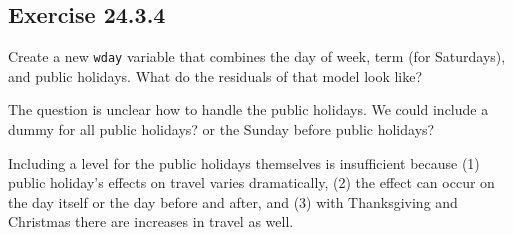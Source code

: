 \documentclass[]{book}
\newenvironment{Shaded}{\begin{snugshade}}{\end{snugshade}}
\newcommand{\CommentTok}[1]{\textcolor[rgb]{0.56,0.35,0.01}{\textit{#1}}}
\newcommand{\KeywordTok}[1]{\textcolor[rgb]{0.13,0.29,0.53}{\textbf{#1}}}
\newcommand{\NormalTok}[1]{#1}
\newcommand{\OperatorTok}[1]{\textcolor[rgb]{0.81,0.36,0.00}{\textbf{#1}}}
\newcommand{\StringTok}[1]{\textcolor[rgb]{0.31,0.60,0.02}{#1}}
\theoremstyle{plain}
\theoremstyle{remark}
\begin{document}
\begin{Shaded}
\end{Shaded}

\hypertarget{exercise-24.3.4}{%
\subsection*{\texorpdfstring{Exercise
{24.3.4}}{Exercise 24.3.4}}\label{exercise-24.3.4}}

Create a new \texttt{wday} variable that combines the day of week, term
(for Saturdays), and public holidays. What do the residuals of that
model look like?

The question is unclear how to handle the public holidays. We could
include a dummy for all public holidays? or the Sunday before public
holidays?

Including a level for the public holidays themselves is insufficient
because (1) public holiday's effects on travel varies dramatically, (2)
the effect can occur on the day itself or the day before and after, and
(3) with Thanksgiving and Christmas there are increases in travel as
well.
\end{document}
